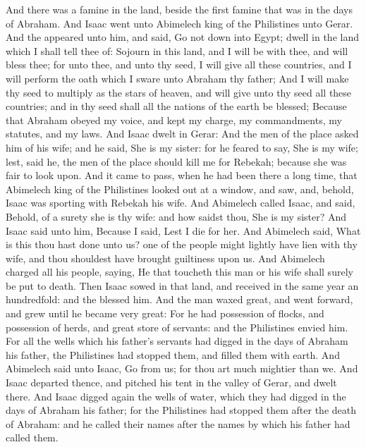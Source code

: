 \begin{biblechapter} %
 And there was a famine in the land, beside the first famine that was in the days of Abraham. And Isaac went unto Abimelech king of the Philistines unto Gerar.
\verse And the \LORD appeared unto him, and said, Go not down into Egypt; dwell in the land which I shall tell thee of:
\verse Sojourn in this land, and I will be with thee, and will bless thee; for unto thee, and unto thy seed, I will give all these countries, and I will perform the oath which I sware unto Abraham thy father;
\verse And I will make thy seed to multiply as the stars of heaven, and will give unto thy seed all these countries; and in thy seed shall all the nations of the earth be blessed;
\verse Because that Abraham obeyed my voice, and kept my charge, my commandments, my statutes, and my laws.
\verse And Isaac dwelt in Gerar:
\verse And the men of the place asked him of his wife; and he said, She is my sister: for he feared to say, She is my wife; lest, said he, the men of the place should kill me for Rebekah; because she was fair to look upon.
\verse And it came to pass, when he had been there a long time, that Abimelech king of the Philistines looked out at a window, and saw, and, behold, Isaac was sporting with Rebekah his wife.
\verse And Abimelech called Isaac, and said, Behold, of a surety she is thy wife: and how saidst thou, She is my sister? And Isaac said unto him, Because I said, Lest I die for her.
\verse And Abimelech said, What is this thou hast done unto us? one of the people might lightly have lien with thy wife, and thou shouldest have brought guiltiness upon us.
\verse And Abimelech charged all his people, saying, He that toucheth this man or his wife shall surely be put to death.
\verse Then Isaac sowed in that land, and received in the same year an hundredfold: and the \LORD blessed him.
\verse And the man waxed great, and went forward, and grew until he became very great:
\verse For he had possession of flocks, and possession of herds, and great store of servants: and the Philistines envied him.
\verse For all the wells which his father's servants had digged in the days of Abraham his father, the Philistines had stopped them, and filled them with earth.
\verse And Abimelech said unto Isaac, Go from us; for thou art much mightier than we.
\verse And Isaac departed thence, and pitched his tent in the valley of Gerar, and dwelt there.
\verse And Isaac digged again the wells of water, which they had digged in the days of Abraham his father; for the Philistines had stopped them after the death of Abraham: and he called their names after the names by which his father had called them.

\end{biblechapter}

